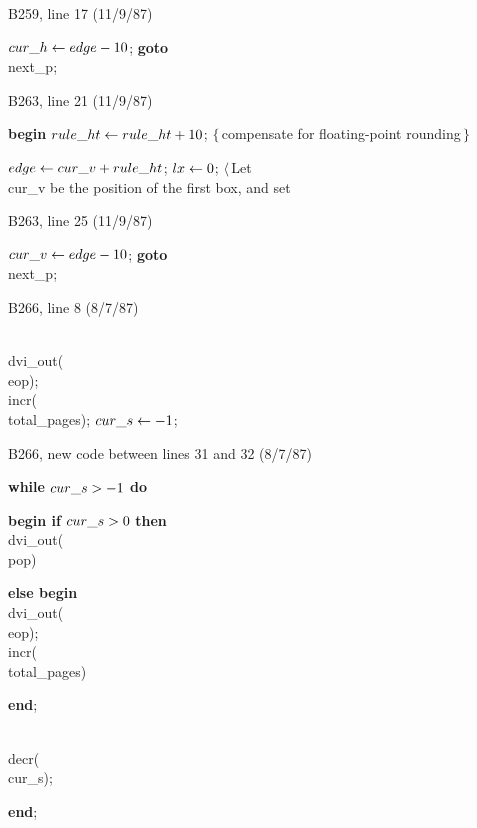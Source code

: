 \bugonpage B259, line 17 (11/9/87)

\ninepoint\noindent\hskip20pt
$\\{cur\_h}\gets\\{edge}-10$; {\bf goto} \\{next\_p};

\bugonpage B263, line 21 (11/9/87)

\ninepoint\noindent\hskip20pt
{\bf begin }$\\{rule\_ht}\gets\\{rule\_ht}+10$;\quad
$\{\,$compensate for floating-point rounding$\,\}$\par\noindent\hskip20pt
$\\{edge}\gets\\{cur\_v}+\\{rule\_ht}$; $\\{lx}\gets0$;
$\langle\,$Let \\{cur\_v} be the position of the first box, and set

\bugonpage B263, line 25 (11/9/87)

\ninepoint\noindent\hskip20pt
$\\{cur\_v}\gets\\{edge}-10$; {\bf goto} \\{next\_p};

\bugonpage B266, line 8 (8/7/87)

\ninepoint\noindent\hskip10pt
\\{dvi\_out}(\\{eop}); \\{incr}(\\{total\_pages}); $\\{cur\_s}\gets-1$;

\bugonpage B266, new code between lines 31 and 32 (8/7/87)

\ninepoint
\noindent\hskip10pt{\bf while} $\\{cur\_s}>-1$ {\bf do}\par
\noindent\hskip20pt{\bf begin if} $\\{cur\_s}>0$ {\bf then}
  \\{dvi\_out}(\\{pop})\par
\noindent\hskip20pt{\bf else begin} \\{dvi\_out}(\\{eop});
  \\{incr}(\\{total\_pages})\par
\noindent\hskip30pt{\bf end};\par
\noindent\hskip20pt\\{decr}(\\{cur\_s});\par
\noindent\hskip20pt{\bf end};\par

